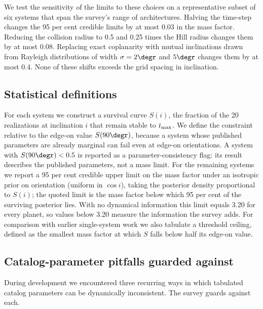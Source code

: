 \documentclass[fleqn,usenatbib]{mnras}
\begin{document}
We test the sensitivity of the limits to these choices on a representative
subset of six systems that span the survey's range of architectures.
Halving the time-step changes the 95 per cent credible limits by at most
0.03 in the mass factor. Reducing the collision radius to 0.5 and 0.25
times the Hill radius changes them by at most 0.08. Replacing exact
coplanarity with mutual inclinations drawn from Rayleigh distributions of
width $\sigma = 2\degr$ and $5\degr$ changes them by at most 0.4. None of
these shifts exceeds the grid spacing in inclination.

\subsection{Statistical definitions} \label{sec:stats}

For each system we construct a survival curve $S(i)$, the fraction of the
20 realizations at inclination $i$ that remain stable to $t_{\rm max}$. We
define the constraint relative to the edge-on value $S(90\degr)$, because
a system whose published parameters are already marginal can fail even at
edge-on orientations. A system with $S(90\degr) < 0.5$ is reported as a
parameter-consistency flag: its result describes the published parameters,
not a mass limit. For the remaining systems we report a 95 per cent
credible upper limit on the mass factor under an isotropic prior on
orientation (uniform in $\cos i$), taking the posterior density
proportional to $S(i)$; the quoted limit is the mass factor below which
95 per cent of the surviving posterior lies. With no dynamical information
this limit equals 3.20 for every planet, so values below 3.20 measure the
information the survey adds. For comparison with earlier single-system
work we also tabulate a threshold ceiling, defined as the smallest mass
factor at which $S$ falls below half its edge-on value.

\subsection{Catalog-parameter pitfalls guarded against}
\label{sec:artifacts}

During development we encountered three recurring ways in which tabulated
catalog parameters can be dynamically inconsistent. The survey guards
against each.
\end{document}
